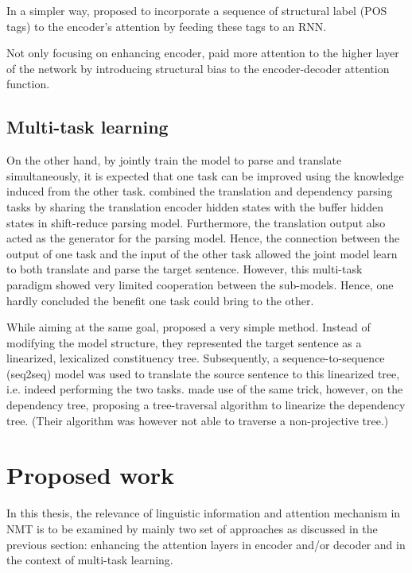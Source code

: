 \documentclass{article}
\begin{document}
In a simpler way, \cite{DBLP:conf/acl/LiXTZZZ17} proposed to incorporate a sequence of structural label (POS tags) to the encoder's attention by feeding these tags to an RNN.

Not only focusing on enhancing encoder, \cite{DBLP:conf/naacl/CohnHVYDH16} paid more attention to the higher layer of the network by introducing structural bias to the encoder-decoder attention function.

\subsection{Multi-task learning}
On the other hand, by jointly train the model to parse and translate simultaneously, it is expected that one task can be improved using the knowledge induced from the other task. \cite{DBLP:conf/acl/EriguchiTC17} combined the translation and dependency parsing tasks by sharing the translation encoder hidden states with the buffer hidden states in shift-reduce parsing model\citep{DBLP:conf/naacl/DyerKBS16}. Furthermore, the translation output also acted as the generator for the parsing model. Hence, the connection between the output of one task and the input of the other task allowed the joint model learn to both translate and parse the target sentence. However, this multi-task paradigm showed very limited cooperation between the sub-models. Hence, one hardly concluded the benefit one task could bring to the other.

While aiming at the same goal, \cite{DBLP:conf/acl/AharoniG17a} proposed a very simple method. Instead of modifying the model structure, they represented the target sentence as a linearized, lexicalized constituency tree. Subsequently, a sequence-to-sequence (seq2seq) model was used to translate the source sentence to this linearized tree, i.e. indeed performing the two tasks. \cite{DBLP:conf/ijcnlp/LeMYM17} made use of the same trick, however, on the dependency tree, proposing a tree-traversal algorithm to linearize the dependency tree. (Their algorithm was however not able to traverse a non-projective tree.)

\section{Proposed work}

In this thesis, the relevance of linguistic information and attention mechanism in NMT is to be examined by mainly two set of approaches as discussed in the previous section: enhancing the attention layers in encoder and/or decoder and in the context of multi-task learning.
\end{document}
